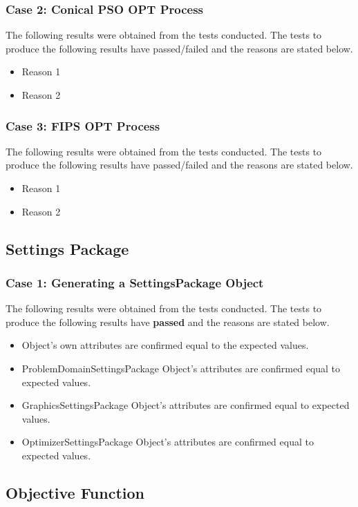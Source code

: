 \documentclass[11pt]{article}
\begin{document}
\subsubsection{Case 2: Conical PSO OPT Process}
The following results were obtained from the tests conducted. The tests to produce the
following results have passed/failed and the reasons are stated below.

\begin{itemize}
	\item Reason 1
	\item Reason 2
\end{itemize}
\subsubsection{Case 3: FIPS OPT Process}
The following results were obtained from the tests conducted. The tests to produce the
following results have passed/failed and the reasons are stated below.

\begin{itemize}
	\item Reason 1
	\item Reason 2
\end{itemize}
\subsection{Settings Package}
\subsubsection{Case 1: Generating a SettingsPackage Object}
The following results were obtained from the tests conducted. The tests to produce the
following results have \textbf{passed} and the reasons are stated below.

\begin{itemize}
	\item Object's own attributes are confirmed equal to the expected values.
	\item ProblemDomainSettingsPackage Object's attributes are confirmed equal to expected values.
	\item GraphicsSettingsPackage Object's attributes are confirmed equal to expected values.
	\item OptimizerSettingsPackage Object's attributes are confirmed equal to expected values.
\end{itemize}


\subsection{Objective Function}
\end{document}
